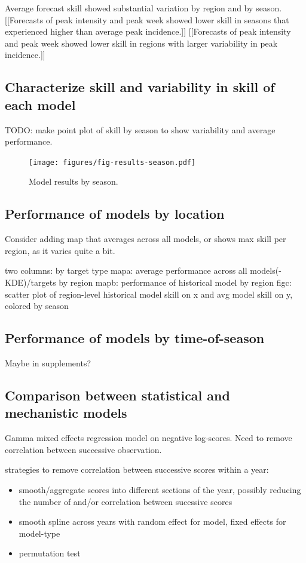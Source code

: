 \documentclass{article}
\begin{document}
Average forecast skill showed substantial variation by region and by season.
[[Forecasts of peak intensity and peak week showed lower skill in seasons that experienced higher than average peak incidence.]]
[[Forecasts of peak intensity and peak week showed lower skill in regions with larger variability in peak incidence.]]

\subsection{Characterize skill and variability in skill of each model}

TODO: make point plot of skill by season to show variability and average performance.

\begin{figure}[htbp]
\begin{center}
\texttt{[image: figures/fig-results-season.pdf]}
\caption{Model results by season.}
\label{fig:results-season}
\end{center}
\end{figure}

\subsection{Performance of models by location}

Consider adding map that averages across all models, or shows max skill per region, as it varies quite a bit.


two columns: by target type
mapa: average performance across all models(-KDE)/targets by region
mapb: performance of historical model by region
figc: scatter plot of region-level historical model skill on x and avg model skill on y, colored by season


\subsection{Performance of models by time-of-season}

Maybe in supplements?


\subsection{Comparison between statistical and mechanistic models}

Gamma mixed effects regression model on negative log-scores. Need to remove correlation between successive observation.

strategies to remove correlation between successive scores within a year:
\begin{itemize}
    \item smooth/aggregate scores into different sections of the year, possibly reducing the number of and/or correlation between sucessive scores
    \item smooth spline across years with random effect for model, fixed effects for model-type
    \item permutation test
\end{itemize}
\end{document}
